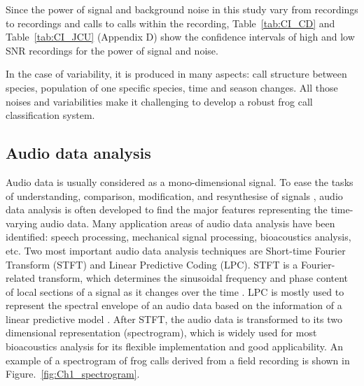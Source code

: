 %



Since the power of signal and background noise in this study vary from recordings to recordings and calls to calls within the recording, Table~\ref{tab:CI_CD} and Table~\ref{tab:CI_JCU} (Appendix D) show the confidence intervals of high and low SNR recordings for the power of signal and noise. 

%



In the case of variability, it is produced in many aspects: call structure between species, population of one specific species, time and season changes. All those noises and variabilities make it challenging to develop a robust frog call classification system. 






\subsection{Audio data analysis}
Audio data is usually considered as a mono-dimensional signal. To ease the tasks of understanding, comparison, modification, and resynthesise of signals \citep{rocchesso2003introduction}, audio data analysis is often developed to find the major features representing the time-varying audio data. Many application areas of audio data analysis have been identified: speech processing, mechanical signal processing, bioacoustics analysis, etc. Two most important audio data analysis techniques are Short-time Fourier Transform (STFT) and Linear Predictive Coding (LPC). STFT is a Fourier-related transform, which determines the sinusoidal frequency and phase content of local sections of a signal as it changes over the time \citep{allen1997short}. LPC is mostly used to represent the spectral envelope of an audio data based on the information of a linear predictive model \citep{deng2003speech}. After STFT, the audio data is transformed to its two dimensional representation (spectrogram), which is widely used for most bioacoustics analysis for its flexible implementation and good applicability.
An example of a spectrogram of frog calls derived from a field recording is shown in Figure.~\ref{fig:Ch1_spectrogram}.

